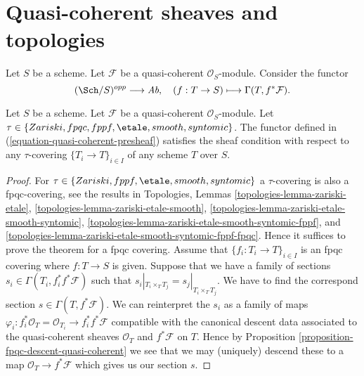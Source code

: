\section{Quasi-coherent sheaves and topologies}
\label{section-quasi-coherent-sheaves}


\noindent
Let $S$ be a scheme.
Let $\mathcal{F}$ be a quasi-coherent $\mathcal{O}_S$-module.
Consider the functor
\begin{equation}
\label{equation-quasi-coherent-presheaf}
(\Sch/S)^{opp} \longrightarrow \textit{Ab},
\quad
(f : T \to S) \longmapsto \Gamma(T, f^*\mathcal{F}).
\end{equation}

\begin{lemma}
\label{lemma-sheaf-condition-holds}
Let $S$ be a scheme.
Let $\mathcal{F}$ be a quasi-coherent $\mathcal{O}_S$-module.
Let $\tau \in \{Zariski, \linebreak[0] fpqc, \linebreak[0] fppf, \linebreak[0]
\etale, \linebreak[0] smooth, \linebreak[0] syntomic\}$.
The functor defined in (\ref{equation-quasi-coherent-presheaf})
satisfies the sheaf condition with respect to any $\tau$-covering
$\{T_i \to T\}_{i \in I}$ of any scheme $T$ over $S$.
\end{lemma}

\begin{proof}
For $\tau \in \{Zariski, \linebreak[0] fppf, \linebreak[0] \etale,
\linebreak[0] smooth, \linebreak[0] syntomic\}$ a $\tau$-covering
is also a fpqc-covering, see the results in
Topologies, Lemmas
\ref{topologies-lemma-zariski-etale},
\ref{topologies-lemma-zariski-etale-smooth},
\ref{topologies-lemma-zariski-etale-smooth-syntomic},
\ref{topologies-lemma-zariski-etale-smooth-syntomic-fppf}, and
\ref{topologies-lemma-zariski-etale-smooth-syntomic-fppf-fpqc}.
Hence it suffices to prove the theorem
for a fpqc covering. Assume that $\{f_i : T_i \to T\}_{i \in I}$
is an fpqc covering where $f : T \to S$ is given. Suppose that
we have a family of sections $s_i \in \Gamma(T_i , f_i^*f^*\mathcal{F})$
such that $s_i|_{T_i \times_T T_j} = s_j|_{T_i \times_T T_j}$.
We have to find the correspond section $s \in \Gamma(T, f^*\mathcal{F})$.
We can reinterpret the $s_i$ as a family of maps
$\varphi_i : f_i^*\mathcal{O}_T = \mathcal{O}_{T_i} \to f_i^*f^*\mathcal{F}$
compatible with the canonical descent data associated to the
quasi-coherent sheaves $\mathcal{O}_T$ and $f^*\mathcal{F}$ on $T$.
Hence by Proposition \ref{proposition-fpqc-descent-quasi-coherent}
we see that we may (uniquely) descend
these to a map $\mathcal{O}_T \to f^*\mathcal{F}$ which gives
us our section $s$.
\end{proof}

